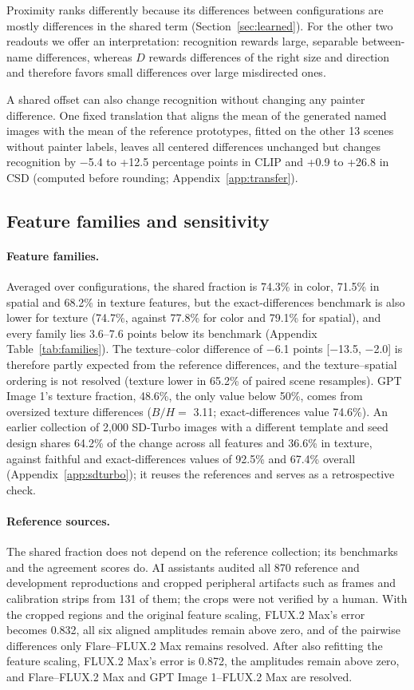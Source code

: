\documentclass[10pt]{article}
\begin{document}
Proximity ranks differently because its differences between configurations are mostly differences
in the shared term (Section~\ref{sec:learned}). For the other two readouts we offer an
interpretation: recognition rewards large, separable between-name differences, whereas $D$ rewards
differences of the right size and direction and therefore favors small differences over large
misdirected ones.

A shared offset can also change recognition without changing any painter difference. One fixed
translation that aligns the mean of the generated named images with the mean of the reference
prototypes, fitted on the other 13 scenes without painter labels, leaves all centered differences
unchanged but changes recognition by $-$5.4 to +12.5 percentage points in CLIP and +0.9 to +26.8 in
CSD (computed before rounding; Appendix~\ref{app:transfer}).

\subsection{Feature families and sensitivity}\label{sec:sensitivity}

\paragraph{Feature families.} Averaged over configurations, the shared fraction is 74.3\% in color,
71.5\% in spatial and 68.2\% in texture features, but the exact-differences benchmark is also lower
for texture (74.7\%, against 77.8\% for color and 79.1\% for spatial), and every family lies 3.6--7.6
points below its benchmark (Appendix Table~\ref{tab:families}). The texture--color difference of
$-$6.1 points [$-$13.5, $-$2.0] is therefore partly expected from the reference differences, and the
texture--spatial ordering is not resolved (texture lower in 65.2\% of paired scene resamples). GPT
Image 1's texture fraction, 48.6\%, the only value below 50\%, comes from oversized texture
differences ($B/H=$ 3.11; exact-differences value 74.6\%). An earlier collection of 2,000 SD-Turbo
images with a different template and seed design shares 64.2\% of the change across all features
and 36.6\% in texture, against faithful and exact-differences values of 92.5\% and 67.4\% overall
(Appendix~\ref{app:sdturbo}); it reuses the references and serves as a retrospective check.

\paragraph{Reference sources.} The shared fraction does not depend on the reference collection; its
benchmarks and the agreement scores do. AI assistants audited all 870 reference and development
reproductions and cropped peripheral artifacts such as frames and calibration strips from 131 of
them; the crops were not verified by a human. With the cropped regions and the original feature
scaling, FLUX.2 Max's error becomes 0.832, all six aligned amplitudes remain above zero, and of the
pairwise differences only Flare--FLUX.2 Max remains resolved. After also refitting the feature
scaling, FLUX.2 Max's error is 0.872, the amplitudes remain above zero, and Flare--FLUX.2 Max and GPT
Image 1--FLUX.2 Max are resolved.
\end{document}
